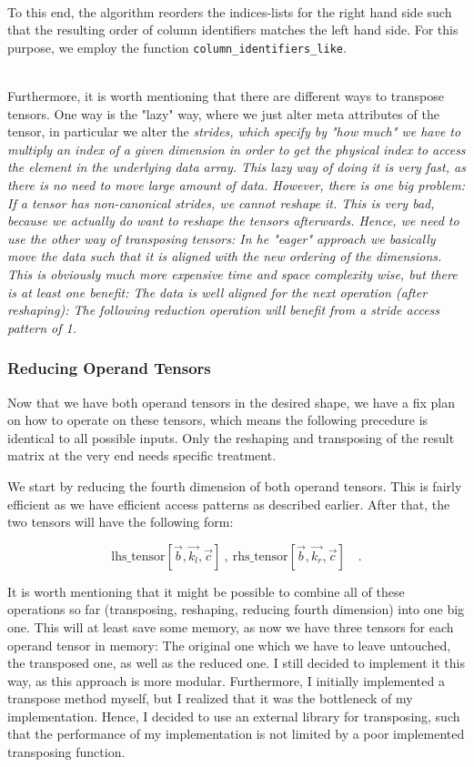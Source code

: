 \documentclass[sigconf]{acmart}
\begin{document}
~\\
To this end, the algorithm reorders the indices-lists for the right hand side such that the resulting order of column identifiers matches the left hand side. For this purpose, we employ the function \texttt{column\_identifiers\_like}.

~\\
Furthermore, it is worth mentioning that there are different ways to transpose tensors. One way is the "lazy" way, where we just alter meta attributes of the tensor, in particular we alter the \em strides\em , which specify by "how much" we have to multiply an index of a given dimension in order to get the physical index to access the element in the underlying data array. This lazy way of doing it is very fast, as there is no need to move large amount of data. However, there is one big problem: If a tensor has non-canonical strides, we cannot reshape it. This is very bad, because we actually do want to reshape the tensors afterwards. Hence, we need to use the other way of transposing tensors: In he "eager" approach we basically move the data such that it is aligned with the new ordering of the dimensions. This is obviously much more expensive time and space complexity wise, but there is at least one benefit: The data is well aligned for the next operation (after reshaping): The following reduction operation will benefit from a stride access pattern of 1.

\subsubsection{Reducing Operand Tensors}
Now that we have both operand tensors in the desired shape, we have a fix plan on how to operate on these tensors, which means the following precedure is identical to all possible inputs. Only the reshaping and transposing of the result matrix at the very end needs specific treatment.

We start by reducing the fourth dimension of both operand tensors. This is fairly efficient as we have efficient access patterns as described earlier. After that, the two tensors will have the following form:

\[ \text{lhs\_tensor}[\vec{b}, \vec{k_l}, \vec{c}] \ , \ \text{rhs\_tensor}[\vec{b}, \vec{k_r}, \vec{c}] \quad . \]

It is worth mentioning that it might be possible to combine all of these operations so far (transposing, reshaping, reducing fourth dimension) into one big one. This will at least save some memory, as now we have three tensors for each operand tensor in memory: The original one which we have to leave untouched, the transposed one, as well as the reduced one. I still decided to implement it this way, as this approach is more modular. Furthermore, I initially implemented a transpose method myself, but I realized that it was the bottleneck of my implementation. Hence, I decided to use an external library for transposing, such that the performance of my implementation is not limited by a poor implemented transposing function.
\end{document}
